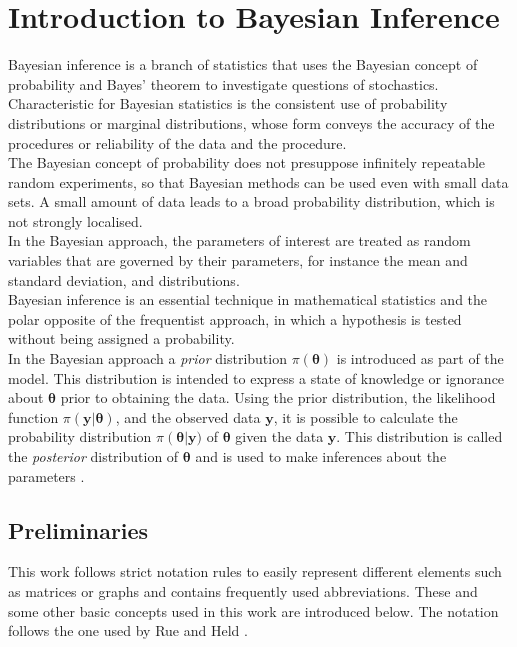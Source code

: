 %
\chapter{Introduction to Bayesian Inference}
\label{sec:bayes}
Bayesian inference is a branch of statistics that uses the Bayesian concept of probability and Bayes' theorem to investigate questions of stochastics. \\
Characteristic for Bayesian statistics is the consistent use of probability distributions or marginal distributions, whose form conveys the accuracy of the procedures or reliability of the data and the procedure. \\
The Bayesian concept of probability does not presuppose infinitely repeatable random experiments, so that Bayesian methods can be used even with small data sets. A small amount of data leads to a broad probability distribution, which is not strongly localised. \\ 
In the Bayesian approach, the parameters of interest are treated as random variables that are governed by their parameters, for instance the mean and standard deviation, and distributions. \\
Bayesian inference is an essential technique in mathematical statistics and the polar opposite of the frequentist approach, in which a hypothesis is tested without being assigned a probability. \\
In the Bayesian approach a \textit{prior} distribution $\pi\left(\pmb{\theta}\right)$ is introduced as part of the model. This distribution is intended to express a state of knowledge or ignorance about $\pmb{\theta}$ prior to obtaining the data. Using the prior distribution, the likelihood function $\pi\left(\pmb{y}|\pmb{\theta}\right)$, and the observed data $\pmb{y}$, it is possible to calculate the probability distribution $\pi\left(\pmb{\theta}\right|\pmb{y})$ of $\pmb{\theta}$ given the data $\pmb{y}$. This distribution is called the \textit{posterior} distribution of $\pmb{\theta}$ and is used to make inferences about the parameters \autocite[][6]{box2011bayesian}.
\clearpage
\section{Preliminaries}
This work follows strict notation rules to easily represent different elements such as matrices or graphs and contains frequently used abbreviations. These and some other basic concepts used in this work are introduced below. The notation follows the one used by Rue and Held \autocite[][14--19]{rue2005gaussian}.
